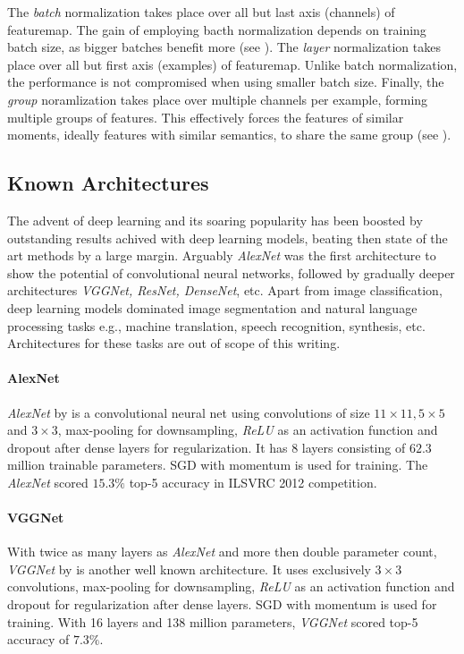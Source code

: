 The \emph{batch} normalization takes place over all but last axis (channels) of featuremap. The gain of employing bacth normalization depends on training batch size, as bigger batches benefit more (see \cite{DBLP:journals/corr/IoffeS15}). The \emph{layer} normalization takes place over all but first axis (examples) of featuremap. Unlike batch normalization, the performance is not compromised when using smaller batch size. Finally, the \emph{group} noramlization takes place over multiple channels per example, forming multiple groups of features. This effectively forces the features of similar moments, ideally features with similar semantics, to share the same group (see \cite{DBLP:journals/corr/abs-1803-08494}).

\subsection{Known Architectures}
The advent of deep learning and its soaring popularity has been boosted by outstanding results achived with deep learning models, beating then state of the art methods by a large margin. Arguably \emph{AlexNet} was the first architecture to show the potential of convolutional neural networks, followed by gradually deeper architectures \emph{VGGNet, ResNet, DenseNet}, etc. Apart from image classification, deep learning models dominated image segmentation and natural language processing tasks e.g., machine translation, speech recognition, synthesis, etc. Architectures for these tasks are out of scope of this writing.

\paragraph{AlexNet}
\emph{AlexNet} by \cite{alexnet} is a convolutional neural net using convolutions of size $11 \times 11, 5 \times 5$ and $3 \times 3$, max-pooling for downsampling, \emph{ReLU} as an activation function and dropout after dense layers for regularization. It has 8 layers consisting of $62.3$ million trainable parameters. SGD with momentum is used for training. The \emph{AlexNet} scored $15.3\%$ top-5 accuracy in ILSVRC 2012 competition.

\paragraph{VGGNet}
With twice as many layers as \emph{AlexNet} and more then double parameter count, \emph{VGGNet} by \cite{DBLP:journals/corr/SimonyanZ14a} is another well known architecture. It uses exclusively $3 \times 3$ convolutions, max-pooling for downsampling, \emph{ReLU} as an activation function and dropout for regularization after dense layers. SGD with momentum is used for training. With 16 layers and 138 million parameters, \emph{VGGNet} scored top-5 accuracy of $7.3\%$.

